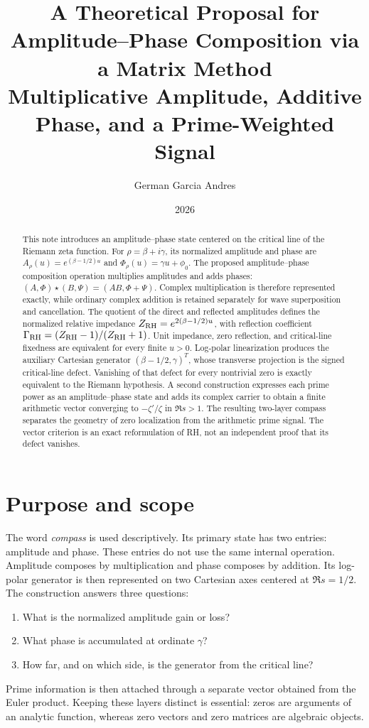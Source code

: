 \documentclass[11pt]{article}
\title{\textbf{A Theoretical Proposal for Amplitude--Phase Composition via a Matrix Method}\\[2mm]
\large Multiplicative Amplitude, Additive Phase, and a Prime-Weighted Signal}
\author{German Garcia Andres}
\date{2026}
\begin{document}
\maketitle

\begin{abstract}
This note introduces an amplitude--phase state centered on the critical line of the Riemann
zeta function.  For $\rho=\beta+i\gamma$, its normalized amplitude and phase are
$A_\rho(u)=e^{(\beta-1/2)u}$ and $\Phi_\rho(u)=\gamma u+\phi_0$.  The proposed amplitude--phase composition operation
multiplies amplitudes and adds phases:
$(A,\Phi)\star(B,\Psi)=(AB,\Phi+\Psi)$.  Complex multiplication is therefore represented
exactly, while ordinary complex addition is retained separately for wave superposition and
cancellation.  The quotient of the direct and reflected amplitudes defines the normalized
relative impedance $Z_{\rm RH}=e^{2(\beta-1/2)u}$, with reflection coefficient
$\Gamma_{\rm RH}=(Z_{\rm RH}-1)/(Z_{\rm RH}+1)$.  Unit impedance, zero reflection, and
critical-line fixedness are equivalent for every finite $u>0$.  Log-polar linearization produces the auxiliary Cartesian generator
$(\beta-1/2,\gamma)^T$, whose transverse projection is the signed critical-line defect.
Vanishing of that defect for every nontrivial zero is exactly equivalent to the Riemann
hypothesis.  A second construction expresses each prime power as an amplitude--phase state and
adds its complex carrier to obtain a finite arithmetic vector converging to
$-\zeta'/\zeta$ in $\Re s>1$.  The resulting two-layer compass separates the geometry of zero
localization from the arithmetic prime signal.  The vector criterion is an exact reformulation
of RH, not an independent proof that its defect vanishes.
\end{abstract}

\section{Purpose and scope}
The word \emph{compass} is used descriptively.  Its primary state has two entries: amplitude
and phase.  These entries do not use the same internal operation.  Amplitude composes by
multiplication and phase composes by addition.  Its log-polar generator is then represented on
two Cartesian axes centered at $\Re s=1/2$.  The construction answers three questions:
\begin{enumerate}
 \item What is the normalized amplitude gain or loss?
 \item What phase is accumulated at ordinate $\gamma$?
 \item How far, and on which side, is the generator from the critical line?
\end{enumerate}
Prime information is then attached through a separate vector obtained from the Euler product.
Keeping these layers distinct is essential: zeros are arguments of an analytic function,
whereas zero vectors and zero matrices are algebraic objects.
\end{document}
